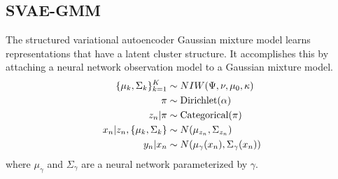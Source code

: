 \subsection{SVAE-GMM}
The structured variational autoencoder Gaussian mixture model \citep[SVAE-GMM; ][]{Johnson2016} learns representations
that have a latent cluster structure.
It accomplishes this by attaching a neural network observation model
to a Gaussian mixture model.
\begin{align*}
    \{\mu_k, \Sigma_k\}_{k = 1}^K &\sim NIW(\Psi, \nu, \mu_0, \kappa) \\
    \pi &\sim \text{Dirichlet}(\alpha) \\
    z_n | \pi &\sim \text{Categorical}(\pi) \\
    x_n | z_n, \{\mu_k, \Sigma_k\} &\sim N(\mu_{z_n}, \Sigma_{z_n}) \\
    y_n | x_n &\sim N(\mu_\gamma(x_n), \Sigma_\gamma(x_n))
\end{align*}
where $\mu_\gamma$ and $\Sigma_\gamma$ are a neural network parameterized by $\gamma$.

